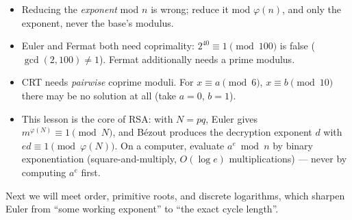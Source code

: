 \begin{remark}
\begin{itemize}
  \item Reducing the \emph{exponent} mod $n$ is wrong; reduce it
  mod $\varphi(n)$, and only the exponent, never the base's modulus.
  \item Euler and Fermat both need coprimality: $2^{40} \equiv 1
  \pmod{100}$ is false ($\gcd(2,100) \ne 1$). Fermat additionally needs
  a prime modulus.
  \item CRT needs \emph{pairwise} coprime moduli. For
  $x \equiv a \pmod{6}$, $x \equiv b \pmod{10}$ there may be no
  solution at all (take $a=0$, $b=1$).
  \item This lesson is the core of RSA: with $N=pq$, Euler gives
  $m^{\varphi(N)} \equiv 1 \pmod{N}$, and B\'ezout produces the
  decryption exponent $d$ with $ed \equiv 1 \pmod{\varphi(N)}$.
  On a computer, evaluate $a^e \bmod n$ by binary exponentiation
  (square-and-multiply, $O(\log e)$ multiplications) --- never by
  computing $a^e$ first.
\end{itemize}
\end{remark}

Next we will meet order, primitive roots, and discrete logarithms, which
sharpen Euler from ``some working exponent'' to ``the exact cycle
length''.
